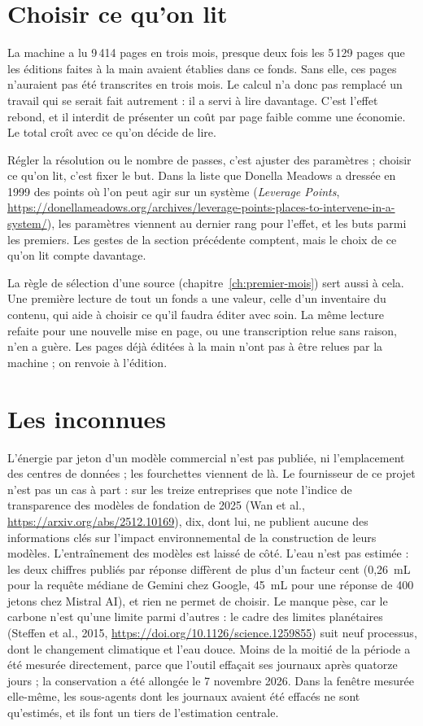 \section{Choisir ce qu'on lit}

La machine a lu 9\,414 pages en trois mois, presque deux fois les 5\,129 pages que les
éditions faites à la main avaient établies dans ce fonds. Sans elle, ces pages n'auraient
pas été transcrites en trois mois. Le calcul n'a donc pas remplacé un travail qui se serait
fait autrement : il a servi à lire davantage. C'est l'effet rebond, et il interdit de
présenter un coût par page faible comme une économie. Le total croît avec ce qu'on décide
de lire.

Régler la résolution ou le nombre de passes, c'est ajuster des paramètres ; choisir ce
qu'on lit, c'est fixer le but. Dans la liste que Donella Meadows a dressée en 1999 des
points où l'on peut agir sur un système (\emph{Leverage Points},
\url{https://donellameadows.org/archives/leverage-points-places-to-intervene-in-a-system/}),
les paramètres viennent au dernier rang pour l'effet, et les buts parmi les premiers. Les
gestes de la section précédente comptent, mais le choix de ce qu'on lit compte davantage.

La règle de sélection d'une source (chapitre~\ref{ch:premier-mois}) sert aussi à cela. Une
première lecture de tout un fonds a une valeur, celle d'un inventaire du contenu, qui aide
à choisir ce qu'il faudra éditer avec soin. La même lecture refaite pour une nouvelle mise
en page, ou une transcription relue sans raison, n'en a guère. Les pages déjà éditées à la
main n'ont pas à être relues par la machine ; on renvoie à l'édition.

\section{Les inconnues}

L'énergie par jeton d'un modèle commercial n'est pas publiée, ni l'emplacement des centres
de données ; les fourchettes viennent de là. Le fournisseur de ce projet n'est pas un cas à
part : sur les treize entreprises que note l'indice de transparence des modèles de
fondation de 2025 (Wan et al., \url{https://arxiv.org/abs/2512.10169}), dix, dont lui, ne
publient aucune des informations clés sur l'impact environnemental de la construction de
leurs modèles. L'entraînement des modèles est laissé de côté.
L'eau n'est pas estimée : les deux chiffres publiés par réponse diffèrent de plus d'un
facteur cent (0,26~mL pour la requête médiane de Gemini chez Google, 45~mL pour une réponse
de 400 jetons chez Mistral AI), et rien ne permet de choisir. Le manque pèse, car le
carbone n'est qu'une limite parmi d'autres : le cadre des limites planétaires (Steffen et
al., 2015, \url{https://doi.org/10.1126/science.1259855}) suit neuf processus, dont le
changement climatique et l'eau douce. Moins de la moitié de la période a été mesurée
directement, parce que l'outil effaçait ses journaux après quatorze jours ; la
conservation a été allongée le 7 novembre 2026. Dans la fenêtre mesurée elle-même, les
sous-agents dont les journaux avaient été effacés ne sont qu'estimés, et ils font un tiers
de l'estimation centrale.

